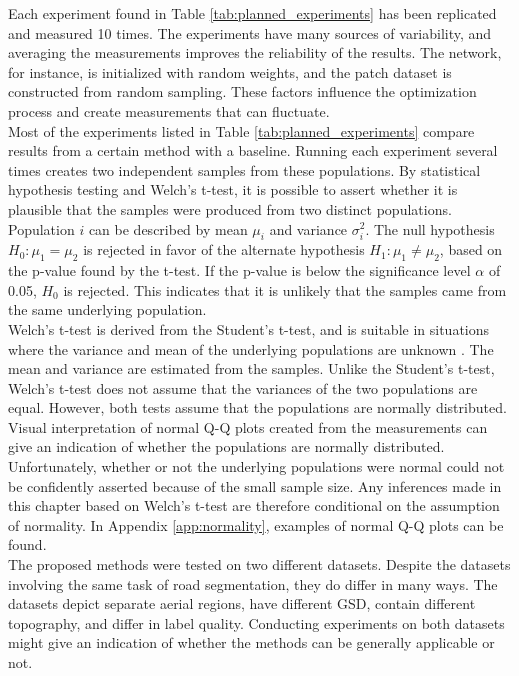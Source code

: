 Each experiment found in Table \ref{tab:planned_experiments} has been replicated and measured 10 times. The experiments have many sources of variability, and averaging the measurements improves the reliability of the results. The network, for instance, is initialized with random weights, and the patch dataset is constructed from random sampling. These factors influence the optimization process and create measurements that can fluctuate.\\

Most of the experiments listed in Table \ref{tab:planned_experiments} compare results from a certain method with a baseline. Running each experiment several times creates two independent samples from these populations. By statistical hypothesis testing and Welch's t-test, it is possible to assert whether it is plausible that the samples were produced from two distinct populations. Population $i$ can be described by mean $\mu_i$ and variance $\sigma^2_i$. The null hypothesis $H_0\colon \mu_1 = \mu_2$ is rejected in favor of the alternate hypothesis $H_1\colon\mu_1 \neq \mu_2$, based on the p-value found by the t-test.  If the p-value is below the significance level $\alpha$ of 0.05, $H_0$ is rejected. This indicates that it is unlikely that the samples came from the same underlying population.\\

Welch's t-test is derived from the Student's t-test, and is suitable in situations where the variance and mean of the underlying populations are unknown \citep{walpole_probability}. The mean and variance are estimated from the samples. Unlike the Student's t-test, Welch's t-test does not assume that the variances of the two populations are equal. However, both tests assume that the populations are normally distributed. Visual interpretation of normal Q-Q plots created from the measurements can give an indication of whether the populations are normally distributed. Unfortunately, whether or not the underlying populations were normal could not be confidently asserted because of the small sample size. Any inferences made in this chapter based on Welch's t-test are therefore conditional on the assumption of normality. In Appendix \ref{app:normality}, examples of normal Q-Q plots can be found.\\ 
 
The proposed methods were tested on two different datasets. Despite the datasets involving the same task of road segmentation, they do differ in many ways. The datasets depict separate aerial regions, have different \ac{GSD}, contain different topography, and differ in label quality. Conducting experiments on both datasets might give an indication of whether the methods can be generally applicable or not.\\

